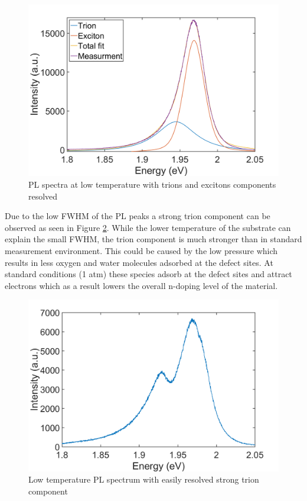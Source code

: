 \begin{figure}[!ht]
	\begin{center}
		\includegraphics[scale=0.4]{LowT/LowTPLDeconvolution.png}
		\caption{PL spectra at low temperature with trions and excitons components resolved}
		\label{fig:LowTPLDeconvolution}
	\end{center}
\end{figure}

Due to the low FWHM of the PL peaks a strong trion component can be observed as seen in Figure \ref{fig:LowTPLStrongTrion}. While the lower temperature of the substrate can explain the small FWHM, the trion component is much stronger than in standard measurement environment. This could be caused by the low pressure which results in less oxygen and water molecules adsorbed at the defect sites. At standard conditions (1 atm) these species adsorb at the defect sites and attract electrons which as a result lowers the overall n-doping level of the material. 

\begin{figure}[!ht]
	\begin{center}
		\includegraphics[scale=0.4]{LowT/LowTPLStrongTrion.png}
		\caption{Low temperature PL spectrum with easily resolved strong trion component}
		\label{fig:LowTPLStrongTrion}
	\end{center}
\end{figure}

